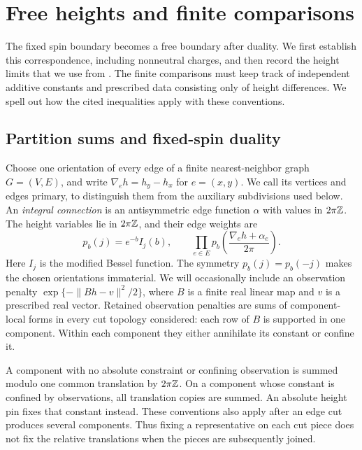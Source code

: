 \section{Free heights and finite comparisons}\label{sec:heights}

The fixed spin boundary becomes a free boundary after duality. We first
establish this correspondence, including nonneutral charges, and then
record the height limits that we use from \cite{C}. The finite comparisons
must keep track of independent additive constants and prescribed data
consisting only of height differences. We spell out how the cited
inequalities apply with these conventions.

\subsection{Partition sums and fixed-spin duality}

Choose one orientation of every edge of a finite nearest-neighbor graph
\(G=(V,E)\), and write \(\nabla_eh=h_y-h_x\) for \(e=(x,y)\).
We call its vertices and edges primary, to distinguish them from the
auxiliary subdivisions used below.
An \emph{integral connection} is an antisymmetric edge function
\(\alpha\) with values in \(2\pi\mathbb Z\). The height variables lie in
\(2\pi\mathbb Z\), and their edge weights are
\begin{equation}\label{heights:weights}
 p_b(j)=e^{-b}I_j(b),\qquad
 \prod_{e\in E}p_b\left(\frac{\nabla_eh+\alpha_e}{2\pi}\right).
\end{equation}
Here \(I_j\) is the modified Bessel function. The symmetry
\(p_b(j)=p_b(-j)\) makes the chosen orientations immaterial. We will
occasionally include an observation penalty
\(\exp\{-\|Bh-v\|^2/2\}\), where \(B\) is a finite real linear map
and \(v\) is a prescribed real vector. Retained observation penalties
are sums of component-local forms in every cut topology considered:
each row of \(B\) is supported in one component. Within each component
they either annihilate its constant or confine it.

A component with no absolute constraint or confining observation is
summed modulo one common translation by \(2\pi\mathbb Z\). On a component whose
constant is confined by observations, all translation copies are summed.
An absolute height pin fixes that constant instead. These conventions
also apply after an edge cut produces several components. Thus fixing a
representative on each cut piece does not fix the relative translations
when the pieces are subsequently joined.

